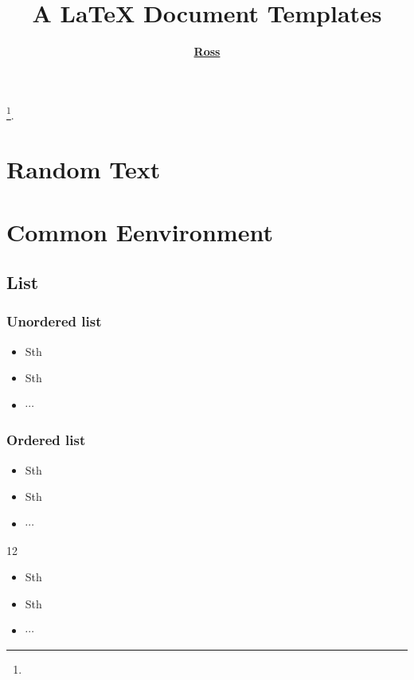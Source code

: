 \documentclass[a4paper, 12pt]{article}
\begin{document}
\title{\bf {A \LaTeX{} Document Templates}} \author{\bf
  \href{https://matnoble.github.io/about/}{Ross}} \date{}

\pagestyle{fancy}  \fancyhead[R]{\textcolor{PrimaryColor}{Ross}}

\maketitle
\tableofcontents

\footnote{\noindent {} \newline
  \updatetext{\today}}.

\clearpage
\listoflistings

\clearpage

\section{Random Text}
\lipsum[2-4]
\clearpage

\section{Common Eenvironment}

\subsection{List}

\subsubsection{Unordered list}
\begin{itemize}
    \item Sth
    \item Sth
    \item $\cdots$
\end{itemize}
\subsubsection{Ordered list}
\begin{itemize}
    \item[(1)] Sth
    \item[(2)] Sth
    \item[(3)] $\cdots$
\end{itemize}
\begin{mybox}{12}
    \begin{itemize}[leftmargin = 10pt]
        \item Sth
        \item Sth
        \item $\cdots$
    \end{itemize}
\end{mybox}
\end{document}
